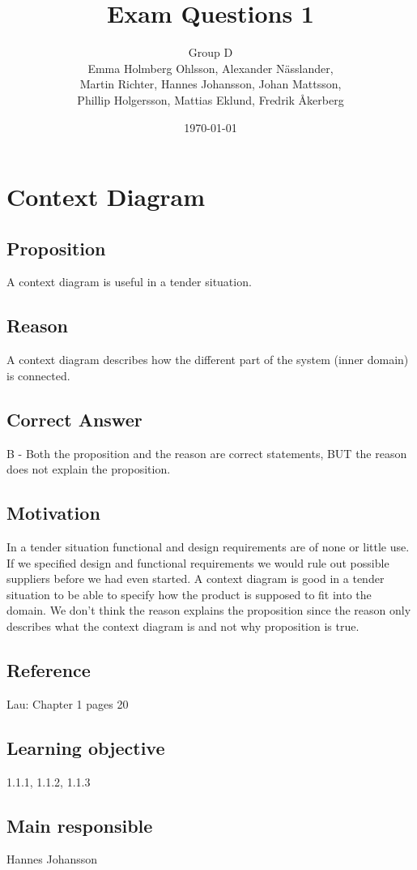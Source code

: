 \documentclass[a4paper]{article}
\title{Exam Questions 1}
\author{Group D\\ Emma Holmberg Ohlsson, Alexander Nässlander,\\Martin Richter, Hannes Johansson, Johan Mattsson,\\Phillip Holgersson, Mattias Eklund, Fredrik Åkerberg}
\date{\today}
\begin{document}
	\maketitle
	\thispagestyle{empty}
	\setcounter{page}{0}
	\pagebreak

\section{Context Diagram}
\subsection*{Proposition}
A context diagram is useful in a tender situation.
\subsection*{Reason}
A context diagram describes how the different part of the system (inner domain) is connected.
\subsection*{Correct Answer}
B - Both the proposition and the reason are correct statements, BUT the reason does not explain the proposition.
\subsection*{Motivation}
In a tender situation functional and design requirements are of none or little use. If we specified design and functional requirements we would rule out possible suppliers before we had even started.
A context diagram is good in a tender situation to be able to specify how the product is supposed to fit into the domain.
We don't think the reason explains the proposition since the reason only describes what the context diagram is and not why proposition is true.
\subsection*{Reference}
Lau: Chapter 1 pages 20
\subsection*{Learning objective}
1.1.1, 1.1.2, 1.1.3
\subsection*{Main responsible}
Hannes Johansson
\end{document}
